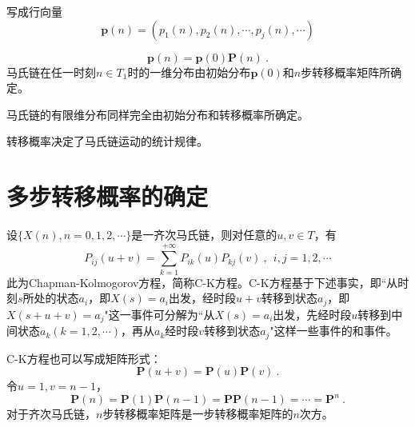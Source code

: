 \documentclass[12pt,a4paper]{article}
\renewcommand{\vec}[1]{\boldsymbol{#1}}
\begin{document}
写成行向量
\begin{equation}
\vec{p}(n) = (p_1(n), p_2(n), \cdots, p_j(n), \cdots)
\end{equation}

\begin{equation}
\vec{p}(n) = \vec{p}(0) \vec{P}(n)  ~.
\end{equation}
马氏链在任一时刻$n \in T_1$时的一维分布由初始分布$\vec{p}(0)$和$n$步转移概率矩阵所确定。


马氏链的有限维分布同样完全由初始分布和转移概率所确定。

转移概率决定了马氏链运动的统计规律。


\section{多步转移概率的确定}
设$\{X(n), n = 0, 1, 2, \cdots \}$是一齐次马氏链，则对任意的$u, v \in T$，有
\begin{equation}
P_{ij} (u +v) = \sum_{k=1}^{+\infty} P_{ik}(u) P_{kj}(v) ~, ~~ i, j = 1, 2, \cdots 
\end{equation}
此为Chapman-Kolmogorov方程，简称C-K方程。C-K方程基于下述事实，即``从时刻$s$所处的状态$a_i$，即$X(s) = a_i$出发，经时段$u+v$转移到状态$a_j$，即$X(s+u+v) = a_j$"这一事件可分解为``从$X(s) = a_i$出发，先经时段$u$转移到中间状态$a_k(k = 1, 2, \cdots)$，再从$a_k$经时段$v$转移到状态$a_j$"这样一些事件的和事件。

C-K方程也可以写成矩阵形式：
\begin{equation}
\vec{P} (u +v) = \vec{P} (u) \vec{P} (v) ~.
\end{equation}
令$u = 1, v = n-1$，
\begin{equation}
\vec{P} (n) = \vec{P} (1) \vec{P} (n-1) = \vec{P}\vec{P}(n-1) = \cdots = \vec{P}^n ~.
\end{equation}
对于齐次马氏链，$n$步转移概率矩阵是一步转移概率矩阵的$n$次方。
\end{document}
